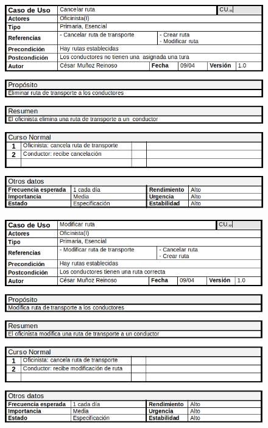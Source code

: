 \begin{figure}[H]
	\centering
	\includegraphics[width=16cm]{31}
\end{figure}
\begin{figure}[H]
	\centering
	\includegraphics[width=16cm]{32}
\end{figure}
